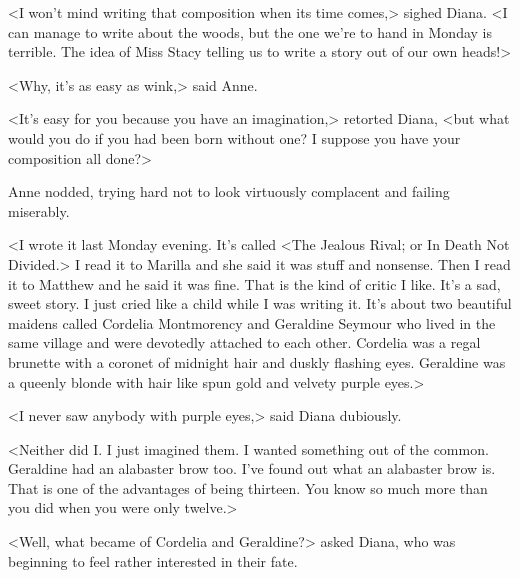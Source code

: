 <I won't mind writing that composition when its time comes,> sighed Diana. <I can manage to write about the woods, but the one we're to hand in Monday is terrible. The idea of Miss Stacy telling us to write a story out of our own heads!>

<Why, it's as easy as wink,> said Anne.

<It's easy for you because you have an imagination,> retorted Diana, <but what would you do if you had been born without one? I suppose you have your composition all done?>

Anne nodded, trying hard not to look virtuously complacent and failing miserably.

<I wrote it last Monday evening. It's called <The Jealous Rival; or In Death Not Divided.> I read it to Marilla and she said it was stuff and nonsense. Then I read it to Matthew and he said it was fine. That is the kind of critic I like. It's a sad, sweet story. I just cried like a child while I was writing it. It's about two beautiful maidens called Cordelia Montmorency and Geraldine Seymour who lived in the same village and were devotedly attached to each other. Cordelia was a regal brunette with a coronet of midnight hair and duskly flashing eyes. Geraldine was a queenly blonde with hair like spun gold and velvety purple eyes.>

<I never saw anybody with purple eyes,> said Diana dubiously.

<Neither did I\@. I just imagined them. I wanted something out of the common. Geraldine had an alabaster brow too. I've found out what an alabaster brow is. That is one of the advantages of being thirteen. You know so much more than you did when you were only twelve.>

<Well, what became of Cordelia and Geraldine?> asked Diana, who was beginning to feel rather interested in their fate.

